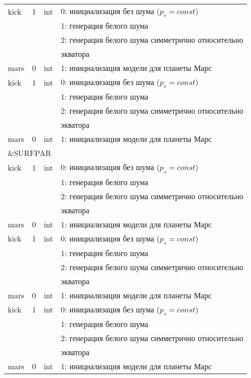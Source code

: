 \begin{longtable}[c]{|l|c|l|l|}
    kick & 1 & int & 0: инициализация без шума ($p_s = const$) \\
          &   &     & 1: генерация белого шума                  \\
          &   &     & 2: генерация белого шума симметрично относительно \\
      & & & экватора    \\
     mars & 0 & int & 1: инициализация модели для планеты Марс     \\
    kick & 1 & int & 0: инициализация без шума ($p_s = const$) \\
          &   &     & 1: генерация белого шума                  \\
          &   &     & 2: генерация белого шума симметрично относительно \\
      & & & экватора    \\
     mars & 0 & int & 1: инициализация модели для планеты Марс     \\
     \hline
     \multicolumn{4}{|l|}{\&SURFPAR}        \\ \hline
    kick & 1 & int & 0: инициализация без шума ($p_s = const$) \\
          &   &     & 1: генерация белого шума                  \\
          &   &     & 2: генерация белого шума симметрично относительно \\
      & & & экватора    \\
     mars & 0 & int & 1: инициализация модели для планеты Марс     \\
    kick & 1 & int & 0: инициализация без шума ($p_s = const$) \\
          &   &     & 1: генерация белого шума                  \\
          &   &     & 2: генерация белого шума симметрично относительно \\
      & & & экватора    \\
     mars & 0 & int & 1: инициализация модели для планеты Марс     \\
    kick & 1 & int & 0: инициализация без шума ($p_s = const$) \\
          &   &     & 1: генерация белого шума                  \\
          &   &     & 2: генерация белого шума симметрично относительно \\
      & & & экватора    \\
     mars & 0 & int & 1: инициализация модели для планеты Марс     \\

\end{longtable}
